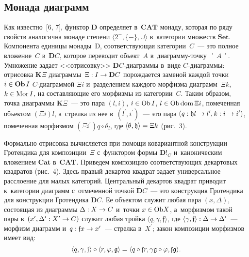 \begin{multicols}{2}
\vspace*{-6pt}

\section{Монада диаграмм}

     Как известно~[6, 7], функтор $\mathbf{D}$ определяет в~$\mathbf{CAT}$ 
монаду, которая по ряду свойств аналогична монаде степени $\langle 2^-, \{-\}, 
\cup\rangle$ в~категории множеств $\mathbf{Set}$. Компонента единицы 
монады~$\mathbf{ }$D, соответствующая категории~$C$~--- это полное 
вложение~$C$ в~$\mathbf{D}C$, которое переводит объект~$A$  
в~диа\-грам\-му-точ\-ку~$\ulcorner A\urcorner$. Умножение задает 
<<отрисовку>> $\mathbf{D}C $-диа\-грам\-мы в~виде $C$-диа\-грам\-мы: 
отрисовка $\mathbf{K}\Xi$ диаграммы~$\Xi : I \hm \to \mathbf{D}C $ 
порождается заменой каж\-дой точки $i \hm\in \mathbf{Ob}\, I$  
$C$-диа\-грам\-мой $\Xi i$ и~разделением каждого морфизма 
диаграмм~$\Xi k$, $k\hm\in \mathrm{Mor}\,I$, на составляющие его 
морфизмы из категории~$C$. Таким образом, точка диаграммы 
$\mathbf{K}\Xi$~--- это пара $(l, i)$, $i \hm\in \mathrm{Ob} \,I$, $l \hm\in 
\mathrm{Ob}\,\mathrm{dom}\, \Xi i$, помеченная объектом $(\Xi i)l$, 
а~стрелка из нее в~$(l^\prime, i^\prime)$~--- это пара $(q : \mathfrak{h}l \hm\to  
l^\prime, k : i \hm\to  i^\prime)$, помеченная морфизмом $(\Xi i^\prime)q \circ 
\theta_l$, где $\langle\theta, \mathfrak{h}\rangle \hm= \Xi k$ (рис.~3).
    

     Формально отрисовка вычисляется при помощи ковариантной 
конструкции Гротендика для композиции~$\Xi$ с~функтором формы 
$\mathbf{D}!_C$ и~каноническим вложением $\mathbf{Cat}$ в~$\mathbf{CAT}$. 
Приведем композицию соответствующих декартовых квадратов (рис.~4).
Здесь правый декартов квадрат задает универсальное расслоение для 
малых категорий. Центральный декартов квадрат приводит к~категории 
диаграмм с~отмеченной точкой $\dot{\mathbf{D}}C$~--- это конструкция 
Гротендика для конструкции Гротендика $\mathbf{D}C$. Ее объектом служит 
любая пара $(x, \Delta)$, состоящая из диаграммы $\Delta : X \hm\to C$ и~точки 
$x \hm\in \mathrm{Ob} X$, а~морфизмом такой пары в~$(x^\prime, \Delta^\prime : 
X^\prime \hm\to  C)$ служит любая тройка $\langle q, \gamma, 
\mathfrak{f}\rangle$, где $\langle \gamma, \mathfrak{f}\rangle : \Delta \hm\to  
\Delta^\prime$~--- морфизм диаграмм и~$q : \mathfrak{f}x \hm\to  x^\prime$~--- 
стрелка в~$X^\prime$; закон композиции морфизмов имеет вид:
$$
\langle q, 
\gamma, \mathfrak{f}\rangle \circ \langle r, \varphi, \mathfrak{g}\rangle\hm = 
\langle q \circ \mathfrak{f}r, \gamma \mathfrak{g} \circ \varphi, 
\mathfrak{fg}\rangle.
$$ 


\end{multicols}
